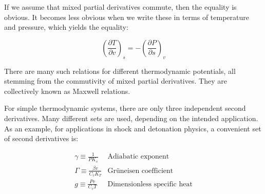 \documentclass[twocolumn,10pt]{asme2ej}
\begin{document}
If we assume that mixed partial derivatives commute, then the equality is obvious. It becomes less obvious when we write these in terms of temperature and pressure, which yields the equality:

\[{\left( {\frac{{\partial T}}{{\partial v}}} \right)_s} =  - {\left( {\frac{{\partial P}}{{\partial s}}} \right)_v}\]

There are many such relations for different thermodynamic potentials, all stemming from the commutivity of mixed partial derivatives. They are collectively known as Maxwell relations. 

For simple thermodynamic systems, there are only three independent second derivatives. Many different sets are used\cite{RN1010,RN819}, depending on the intended application. As an example, for applications in shock and detonation physics, a convenient set of second derivatives is:

\[\begin{array}{*{20}{c}}
{\gamma  \equiv \frac{1}{{P{K_s}}}}&{{\text{Adiabatic exponent}}}\\
{\Gamma  \equiv \frac{{\beta v}}{{{C_v}{K_T}}}}&{{\text{Gr\"uneisen coefficient}}}\\
{g \equiv \frac{{Pv}}{{{C_v}T}}}&{{\text{Dimensionless specific heat}}}
\end{array}\]
\end{document}
